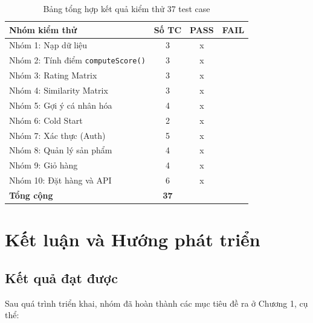 \documentclass{report}
\begin{document}
\begin{table}[H]
    \centering
    \renewcommand{\arraystretch}{1.4}
    \begin{tabularx}{\textwidth}{|>{\raggedright\arraybackslash}X|c|c|c|}
        \hline
        \textbf{Nhóm kiểm thử} & \textbf{Số TC} & \textbf{PASS} & \textbf{FAIL} \\ \hline
        Nhóm 1: Nạp dữ liệu & 3 & x & \\ \hline
        Nhóm 2: Tính điểm \texttt{computeScore()} & 3 & x & \\ \hline
        Nhóm 3: Rating Matrix & 3 & x  & \\ \hline
        Nhóm 4: Similarity Matrix & 3 & x  & \\ \hline
        Nhóm 5: Gợi ý cá nhân hóa & 4 & x  & \\ \hline
        Nhóm 6: Cold Start & 2 & x  & \\ \hline
        Nhóm 7: Xác thực (Auth) & 5 & x  & \\ \hline
        Nhóm 8: Quản lý sản phẩm & 4 & x  & \\ \hline
        Nhóm 9: Giỏ hàng & 4 & x  & \\ \hline
        Nhóm 10: Đặt hàng và API & 6 & x  & \\ \hline
        \textbf{Tổng cộng} & \textbf{37} &  & \\ \hline
    \end{tabularx}
    \caption{Bảng tổng hợp kết quả kiểm thử 37 test case}
    \label{tab:tong_hop_kt}
\end{table}

\chapter{Kết luận và Hướng phát triển}
\label{chap:ketluan}

\section{Kết quả đạt được}

Sau quá trình triển khai, nhóm đã hoàn thành các mục tiêu đề ra ở Chương 1, cụ thể:
\end{document}
